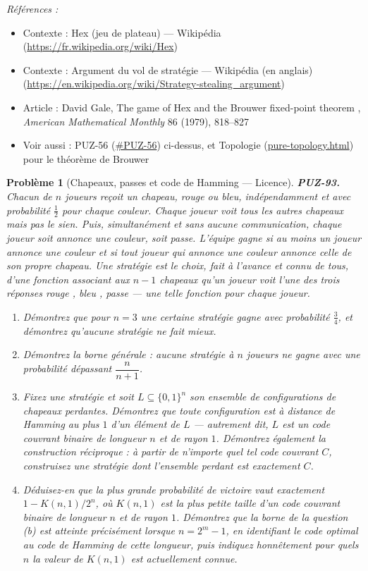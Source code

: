 \documentclass[11pt]{article}
\newtheorem{problem}{Problème}
\newenvironment{refs}{\par\small\noindent\emph{Références :}\begin{itemize}\setlength\itemsep{0pt}}{\end{itemize}\normalsize}
\begin{document}
\begin{refs}
\item Contexte : Hex (jeu de plateau) --- Wikipédia (\url{https://fr.wikipedia.org/wiki/Hex})
\item Contexte : Argument du vol de stratégie --- Wikipédia (en anglais) (\url{https://en.wikipedia.org/wiki/Strategy-stealing_argument})
\item Article : David Gale, \og{} The game of Hex and the Brouwer fixed-point theorem \fg{}, \textit{American Mathematical Monthly} 86 (1979), 818--827
\item Voir aussi : PUZ-56 (\url{#PUZ-56}) ci-dessus, et Topologie (\url{pure-topology.html}) pour le théorème de Brouwer
\end{refs}

\bigskip

\begin{problem}[{Chapeaux, passes et code de Hamming --- Licence}]
\textbf{PUZ-93.} Chacun de $ n $ joueurs reçoit un chapeau, rouge ou bleu,
indépendamment et avec probabilité $ \tfrac{1}{2} $ pour chaque couleur. Chaque joueur voit
tous les autres chapeaux mais pas le sien. Puis, simultanément et sans aucune communication,
chaque joueur soit annonce une couleur, soit passe. L'équipe gagne si au moins un joueur
annonce une couleur et si tout joueur qui annonce une couleur annonce celle de son propre
chapeau. Une stratégie est le choix, fait à l'avance et connu de tous, d'une fonction
associant aux $ n-1 $ chapeaux qu'un joueur voit l'une des trois réponses \og{} rouge \fg{},
\og{} bleu \fg{}, \og{} passe \fg{} --- une telle fonction pour chaque joueur.
\begin{enumerate}
\item[(a)] Démontrez que pour $ n = 3 $ une certaine stratégie gagne avec probabilité
$ \tfrac{3}{4} $, et démontrez qu'aucune stratégie ne fait mieux.
\item[(b)] Démontrez la borne générale : aucune stratégie à $ n $ joueurs ne gagne avec une
probabilité dépassant $ \dfrac{n}{n+1} $.
\item[(c)] Fixez une stratégie et soit $ L \subseteq \{0,1\}^{n} $ son ensemble de configurations
de chapeaux perdantes. Démontrez que toute configuration est à distance de Hamming au plus
$ 1 $ d'un élément de $ L $ --- autrement dit, $ L $ est un code couvrant binaire de
longueur $ n $ et de rayon $ 1 $. Démontrez également la construction réciproque : à
partir de n'importe quel tel code couvrant $ C $, construisez une stratégie dont l'ensemble
perdant est exactement $ C $.
\item[(d)] Déduisez-en que la plus grande probabilité de victoire vaut exactement
$ 1 - K(n,1)/2^{n} $, où $ K(n,1) $ est la plus petite taille d'un code couvrant binaire
de longueur $ n $ et de rayon $ 1 $. Démontrez que la borne de la question (b) est
atteinte précisément lorsque $ n = 2^{m} - 1 $, en identifiant le code optimal au code de
Hamming de cette longueur, puis indiquez honnêtement pour quels $ n $ la valeur de
$ K(n,1) $ est actuellement connue.
\end{enumerate}

\end{problem}
\end{document}
